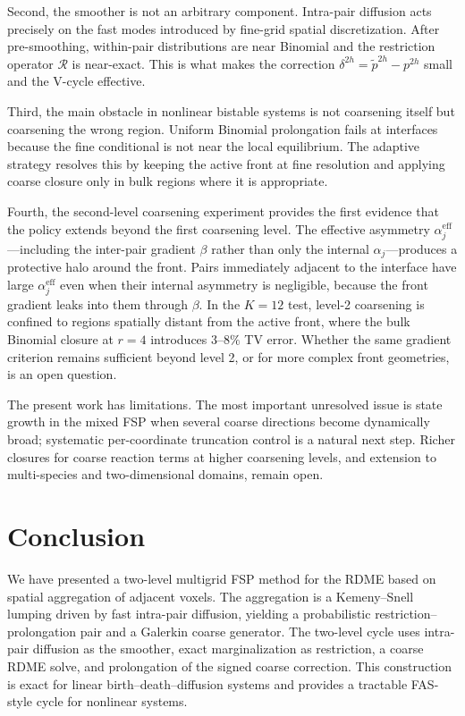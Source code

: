 \documentclass[11pt]{article}
\newcommand{\R}{\mathcal{R}}
\begin{document}
Second, the smoother is not an arbitrary component. Intra-pair diffusion acts
precisely on the fast modes introduced by fine-grid spatial discretization.
After pre-smoothing, within-pair distributions are near Binomial and the
restriction operator $\R$ is near-exact. This is what makes the correction
$\delta^{2h} = \tilde p^{2h} - p^{2h}$ small and the V-cycle effective.

Third, the main obstacle in nonlinear bistable systems is not coarsening itself
but coarsening the wrong region. Uniform Binomial prolongation fails at
interfaces because the fine conditional is not near the local equilibrium.
The adaptive strategy resolves this by keeping the active front at fine
resolution and applying coarse closure only in bulk regions where it is
appropriate.

Fourth, the second-level coarsening experiment provides the first evidence that
the policy extends beyond the first coarsening level. The effective asymmetry
$\alpha_j^{\mathrm{eff}}$---including the inter-pair gradient $\beta$ rather
than only the internal $\alpha_j$---produces a protective halo around the
front. Pairs immediately adjacent to the interface have large
$\alpha_j^{\mathrm{eff}}$ even when their internal asymmetry is negligible,
because the front gradient leaks into them through $\beta$. In the $K=12$
test, level-2 coarsening is confined to regions spatially distant from the
active front, where the bulk Binomial closure at $r=4$ introduces $3$--$8\%$
TV error. Whether the same gradient criterion remains sufficient beyond level
2, or for more complex front geometries, is an open question.

The present work has limitations. The most important unresolved issue is state
growth in the mixed FSP when several coarse directions become dynamically
broad; systematic per-coordinate truncation control is a natural next step.
Richer closures for coarse reaction terms at higher coarsening levels, and
extension to multi-species and two-dimensional domains, remain open.

\section{Conclusion}

We have presented a two-level multigrid FSP method for the RDME based on
spatial aggregation of adjacent voxels. The aggregation is a Kemeny--Snell
lumping driven by fast intra-pair diffusion, yielding a probabilistic
restriction--prolongation pair and a Galerkin coarse generator. The two-level
cycle uses intra-pair diffusion as the smoother, exact marginalization as
restriction, a coarse RDME solve, and prolongation of the signed coarse
correction. This construction is exact for linear birth--death--diffusion
systems and provides a tractable FAS-style cycle for nonlinear systems.
\end{document}
